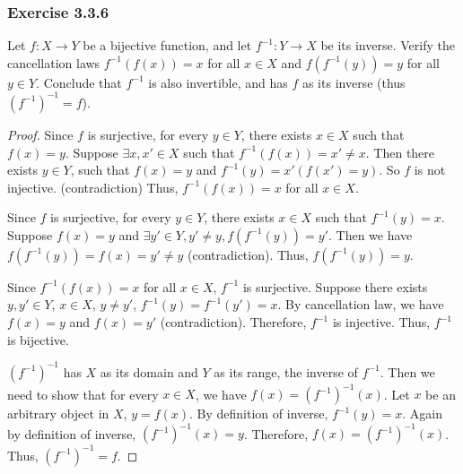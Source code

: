 \documentclass[12pt, letter]{article}
\begin{document}
\subsubsection*{Exercise 3.3.6}
Let $f:X\to Y$ be a bijective function, and let $f^{-1}:Y\to X$ be its inverse. Verify the cancellation laws $f^{-1}(f(x))=x$ for all $x\in X$ and $f(f^{-1}(y))=y$ for all $y\in Y$. Conclude that $f^{-1}$ is also invertible, and has $f$ as its inverse (thus $(f^{-1})^{-1}=f$).
\begin{proof}
    Since $f$ is surjective, for every $y\in Y$, there exists $x\in X$ such that $f(x)=y$. Suppose $\exists x,x'\in X$ such that $f^{-1}(f(x))=x'\ne x$. Then there exists $y\in Y$, such that $f(x)=y$ and $f^{-1}(y)=x' (f(x')=y)$. So $f$ is not injective. (contradiction) Thus, $f^{-1}(f(x))=x$ for all $x\in X$.
    
    Since $f$ is surjective, for every $y\in Y$, there exists $x\in X$ such that $f^{-1}(y)=x$. Suppose $f(x)=y$ and $\exists y'\in Y,y'\ne y, f(f^{-1}(y))=y'$. Then we have $f(f^{-1}(y))=f(x)=y'\ne y$ (contradiction). Thus, $f(f^{-1}(y))=y$. 

    Since $f^{-1}(f(x))=x$ for all $x\in X$, $f^{-1}$ is surjective. Suppose there exists $y,y'\in Y$, $x\in X$, $y\ne y'$, $f^{-1}(y)=f^{-1}(y')=x$. By cancellation law, we have $f(x)=y$ and $f(x)=y'$ (contradiction). Therefore, $f^{-1}$ is injective. 
    Thus, $f^{-1}$ is bijective. 

    $(f^{-1})^{-1}$ has $X$ as its domain and $Y$ as its range, the inverse of $f^{-1}$. Then we need to show that for every $x\in X$, we have $f(x)=(f^{-1})^{-1}(x)$. Let $x$ be an arbitrary object in $X$, $y=f(x)$. By definition of inverse, $f^{-1}(y)=x$. 
    Again by definition of inverse, $(f^{-1})^{-1}(x)=y$. Therefore, $f(x)=(f^{-1})^{-1}(x)$. Thus, $(f^{-1})^{-1}=f$.
\end{proof}
\end{document}
